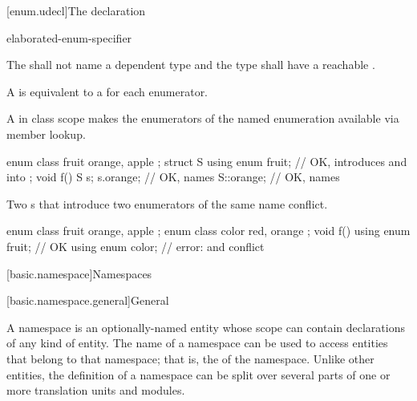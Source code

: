 [enum.udecl]{The  declaration}%
%

\begin{bnf}
\br
     elaborated-enum-specifier \terminal{;}
\end{bnf}

\pnum
The 
shall not name a dependent type
and the type shall have a reachable .

\pnum
A 
is equivalent to a  for each enumerator.

\pnum
\begin{note}
A  in class scope
makes the enumerators of the named enumeration available via member lookup.
\begin{example}
\begin{codeblock}
enum class fruit { orange, apple };
struct S {
  using enum fruit;             // OK, introduces  and  into 
};
void f() {
  S s;
  s.orange;                     // OK, names 
  S::orange;                    // OK, names 
}
\end{codeblock}
\end{example}
\end{note}

\pnum
\begin{note}
Two s
that introduce two enumerators of the same name conflict.
\begin{example}
\begin{codeblock}
enum class fruit { orange, apple };
enum class color { red, orange };
void f() {
  using enum fruit;             // OK
  using enum color;             // error:  and  conflict
}
\end{codeblock}
\end{example}
\end{note}

[basic.namespace]{Namespaces}%

[basic.namespace.general]{General}%

\pnum
A namespace is an optionally-named entity
whose scope can contain declarations of any kind of entity.
The name of a
namespace can be used to access entities that belong to that namespace;
that is, the  of the namespace.
Unlike other entities,
the definition of a namespace can be split over several parts of one or
more translation units and modules.


